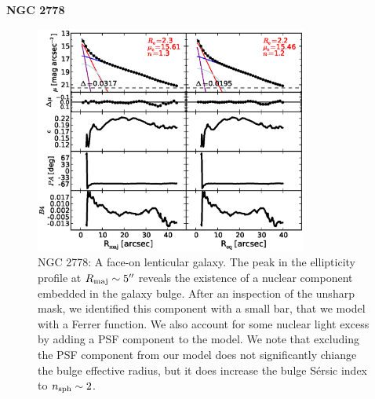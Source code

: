 \documentclass[preprint2]{emulateapj}
\newcommand{\fitfigurewidth}{0.8\textwidth}
\begin{document}
  \clearpage\newpage\noindent
  {\bf NGC 2778 \\}

  \begin{figure}[h]
  \begin{center}
  \includegraphics[width=\fitfigurewidth]{n2778_1Dfit.eps}
  \caption{NGC 2778: 
  A face-on lenticular galaxy. 
  The peak in the ellipticity profile at $R_{\rm maj} \sim 5''$ reveals the existence of a nuclear component 
  embedded in the galaxy bulge.
  After an inspection of the unsharp mask, we identified this component with a small bar,
  that we model with a Ferrer function.
  We also account for some nuclear light excess by adding a PSF component to the model.
  We note that excluding the PSF component from our model does not significantly chiange the 
  bulge effective radius, but it does increase the bulge S\'ersic index to $n_{\rm sph} \sim 2$.
  }
  \end{center}
  \end{figure}
\end{document}
